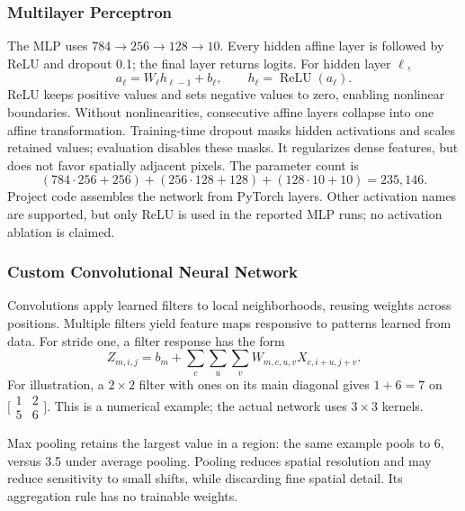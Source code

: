 \subsubsection{Multilayer Perceptron}
The MLP uses \(784\rightarrow256\rightarrow128\rightarrow10\).
Every hidden affine layer is followed by ReLU and dropout 0.1; the final layer
returns logits. For hidden layer \(\ell\),
\[
 a_\ell=W_\ell h_{\ell-1}+b_\ell,\qquad
 h_\ell=\operatorname{ReLU}(a_\ell).
\]
ReLU keeps positive values and sets negative values to zero, enabling nonlinear
boundaries. Without nonlinearities, consecutive affine layers collapse into one
affine transformation. Training-time dropout masks hidden activations and scales
retained values; evaluation disables these masks. It regularizes dense features,
but does not favor spatially adjacent pixels.
The parameter count is
\[
 (784\cdot256+256)+(256\cdot128+128)+(128\cdot10+10)=235,146.
\]
Project code assembles the network from PyTorch layers. Other activation names
are supported, but only ReLU is used in the reported MLP runs; no activation
ablation is claimed.

\subsubsection{Custom Convolutional Neural Network}
Convolutions apply learned filters to local neighborhoods, reusing weights across
positions. Multiple filters yield feature maps responsive to patterns learned
from data. For stride one, a filter response has the form
\[
 Z_{m,i,j}=b_m+\sum_c\sum_u\sum_v W_{m,c,u,v}X_{c,i+u,j+v}.
\]
For illustration, a \(2\times2\) filter with ones on its main diagonal gives
\(1+6=7\) on \(\bigl[\begin{smallmatrix}1&2\\5&6\end{smallmatrix}\bigr]\).
This is a numerical example; the actual network uses \(3\times3\) kernels.

Max pooling retains the largest value in a region: the same example pools to 6,
versus 3.5 under average pooling. Pooling reduces spatial resolution and may reduce
sensitivity to small shifts, while discarding fine spatial detail. Its aggregation
rule has no trainable weights.

